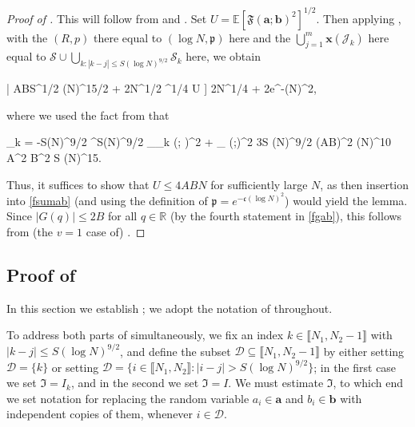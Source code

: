 \documentclass{amsart}
\numberwithin{equation}{section}
\DeclareMathOperator{\Infl}{Infl}
\theoremstyle{remark}
\theoremstyle{definition}
\begin{document}
		
		\begin{proof}[Proof of ]
			
			
			This will follow from  and . Set $U = \mathbb{E} [ \mathfrak{F}(\bm{a};\bm{b})^2 ]^{1/2}$. Then applying , with the $(R, p)$ there equal to $(\log N, \mathfrak{p})$ here and the $\bigcup_{j=1}^m \bm{x}(\mathcal{J}_k)$ here equal to $\mathcal{S} \cup \bigcup_{k: |k - j| \le S(\log N)^{9/2}} \mathcal{S}_k$ here, we obtain 
			\begin{flalign}
				\label{fsumab}
				 \big[ \big| \mathfrak{F} (\bm{a};\bm{b}) - \mathbb{E} [ \mathfrak{F}(\bm{a};\bm{b}) ] \big| \ge ABS^{1/2} (\log N)^{15/2} + 2N^{1/2} ^{1/4} U \big] \le 2N^{1/4} + 2e^{-(\log N)^2},
			\end{flalign}
			
			\noindent where we used the fact from  that 
			\begin{flalign*}
				\displaystyle\sum_{k = -\lfloor S(\log N)^{9/2} \rfloor}^{\lfloor S(\log N)^{9/2} \rfloor} \Infl_{_k} (; )^2  + \Infl_{} (;)^2 \le 3S (\log N)^{9/2} \cdot (AB)^2 (\log N)^{10} \le A^2 B^2 S (\log N)^{15}. 
			\end{flalign*}	
			
			\noindent Thus, it suffices to show that $U \le 4ABN$ for sufficiently large $N$, as then insertion into \eqref{fsumab} (and using the definition of $\mathfrak{p} = e^{-\mathfrak{c}(\log N)^2}$) would yield the lemma. Since $| G(q) | \le 2B$ for all $q \in \mathbb{R}$ (by the fourth statement in \eqref{fgab}), this follows from (the $v=1$ case of) . 		
			\end{proof}
			
			
	
	\subsection{Proof of }
	
	\label{ProofI} 
	
	In this section we establish ; we adopt the notation of  throughout.
	
	To address both parts of  simultaneously, we fix an index $k \in \llbracket N_1, N_2-1 \rrbracket$ with $|k-j| \le S(\log N)^{9/2}$, and define the subset $\mathcal{D} \subseteq \llbracket N_1, N_2-1 \rrbracket$ by either setting $\mathcal{D} = \{ k \}$ or setting $\mathcal{D} = \{ i \in \llbracket N_1, N_2 \rrbracket : |i-j| > S(\log N)^{9/2} \}$; in the first case we set $\mathfrak{I} = I_k$, and in the second we set $\mathfrak{I} = I$. We must estimate $\mathfrak{I}$, to which end we set notation for replacing the random variable $a_i \in \bm{a}$ and $b_i \in \bm{b}$ with independent copies of them, whenever $i \in \mathcal{D}$. 
	
\end{document}

